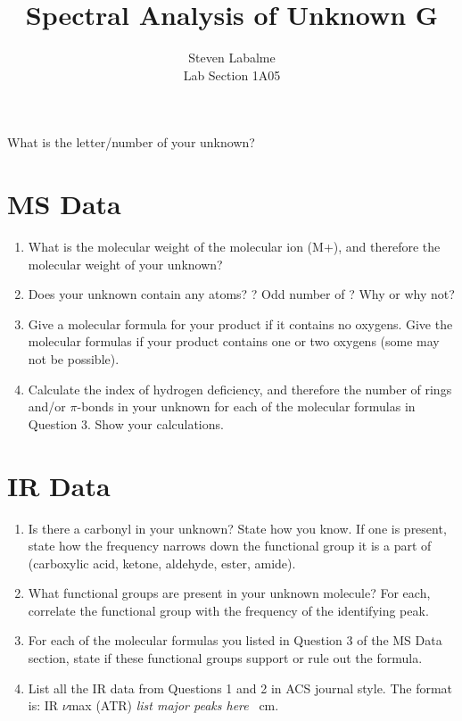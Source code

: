 \documentclass[titlepage]{article}
\title{Spectral Analysis of Unknown G}
\author{
    Steven Labalme\\
    \normalsize Lab Section 1A05
}
\begin{document}
\maketitle



\pagestyle{main}
\renewcommand{\leftmark}{Written Assignment 2}
\noindent What is the letter/number of your unknown?



\section*{MS Data}
\begin{enumerate}
    \item What is the molecular weight of the molecular ion (M+), and therefore the molecular weight of your unknown?
    \item Does your unknown contain any  atoms? ? Odd number of ? Why or why not?
    \item Give a molecular formula for your product if it contains no oxygens. Give the molecular formulas if your product contains one or two oxygens (some may not be possible).
    \item Calculate the index of hydrogen deficiency, and therefore the number of rings and/or $\pi$-bonds in your unknown for each of the molecular formulas in Question 3. Show your calculations.
\end{enumerate}



\section*{IR Data}
\begin{enumerate}
    \item Is there a carbonyl in your unknown? State how you know. If one is present, state how the frequency narrows down the functional group it is a part of (carboxylic acid, ketone, aldehyde, ester, amide).
    \item What functional groups are present in your unknown molecule? For each, correlate the functional group with the frequency of the identifying peak.
    \item For each of the molecular formulas you listed in Question 3 of the MS Data section, state if these functional groups support or rule out the formula.
    \item List all the IR data from Questions 1 and 2 in ACS journal style. The format is: IR $\nu$max (ATR) \emph{list major peaks here} \si{\per\centi\meter}.
\end{enumerate}
\end{document}
